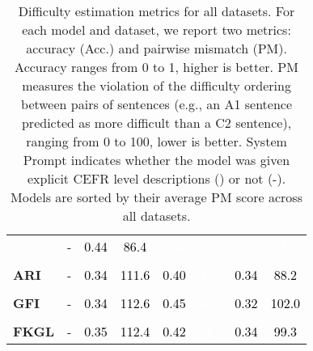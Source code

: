 \begin{table}[!h]
\begin{tabular}{lccccccc}
         & - & \cellcolor[HTML]{8ea5d2}\textcolor{black}{0.44} & \cellcolor[HTML]{c0cce5}\textcolor{black}{86.4} & \cellcolor[HTML]{6382c0}\textcolor{white}{0.61} & \cellcolor[HTML]{1c4aa4}\textcolor{white}{18.3} & \cellcolor[HTML]{3059ac}\textcolor{white}{0.81} & \cellcolor[HTML]{244fa7}\textcolor{white}{21.3} \\
        \\[2pt]
        \textbf{ARI} & - & \cellcolor[HTML]{a8b9dc}\textcolor{black}{0.34} & \cellcolor[HTML]{fcfdfe}\textcolor{black}{111.6} & \cellcolor[HTML]{99add6}\textcolor{black}{0.40} & \cellcolor[HTML]{6281c0}\textcolor{white}{47.1} & \cellcolor[HTML]{a8b9dc}\textcolor{black}{0.34} & \cellcolor[HTML]{c4d0e7}\textcolor{black}{88.2} \\
        \\[2pt]
        \textbf{GFI} & - & \cellcolor[HTML]{a8b9dc}\textcolor{black}{0.34} & \cellcolor[HTML]{ffffff}\textcolor{black}{112.6} & \cellcolor[HTML]{8ca3d1}\textcolor{black}{0.45} & \cellcolor[HTML]{5a7bbd}\textcolor{white}{44.1} & \cellcolor[HTML]{adbdde}\textcolor{black}{0.32} & \cellcolor[HTML]{e5eaf4}\textcolor{black}{102.0} \\
        \\[2pt]
        \textbf{FKGL} & - & \cellcolor[HTML]{a5b7db}\textcolor{black}{0.35} & \cellcolor[HTML]{fefefe}\textcolor{black}{112.4} & \cellcolor[HTML]{93a9d4}\textcolor{black}{0.42} & \cellcolor[HTML]{738fc7}\textcolor{white}{54.5} & \cellcolor[HTML]{a8b9dc}\textcolor{black}{0.34} & \cellcolor[HTML]{dfe5f2}\textcolor{black}{99.3} \\
        \bottomrule
    \end{tabular}
    \caption{Difficulty estimation metrics for all datasets. For each model and dataset, we report two metrics: accuracy (Acc.) and pairwise mismatch (PM). Accuracy ranges from 0 to 1, higher is better. PM measures the violation of the difficulty ordering between pairs of sentences (e.g., an A1 sentence predicted as more difficult than a C2 sentence), ranging from 0 to 100, lower is better. System Prompt indicates whether the model was given explicit CEFR level descriptions (\checkmark) or not (-). Models are sorted by their average PM score across all datasets.}
    \label{tab:difficulty_estimation_metrics}
\end{table}

